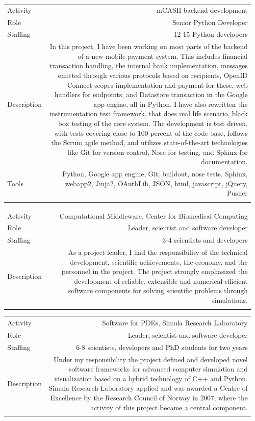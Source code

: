 \documentclass[english,a4paper,11pt]{article}
\begin{document}
\begin{tabular}{@{}LR}
Activity & mCASH backend development\\
Role & Senior Python Developer\\
Staffing & 12-15 Python developers\\
Description & In this project, I have been working on most parts of the backend of a new mobile payment system. This includes financial transaction handling, the internal bank implementation, messages emitted through various protocols based on recipients, OpenID Connect scopes implementation and payment for these, web handlers for endpoints, and Datastore transaction in the Google app engine, all in Python. I have also rewritten the instrumentation test framework, that does real life scenario, black box testing of the core system. The development is test driven, with tests covering close to 100 percent of the code base, follows the Scrum agile method, and utilizes state-of-the-art technologies like Git for version control, Nose for testing, and Sphinx for documentation. \\
Tools & Python, Google app engine, Git, buildout, nose tests, Sphinx, webapp2, Jinja2, OAuthLib, JSON, html, javascript, jQuery, Pusher\\ 
\addlinespace \bottomrule[.1pt] \addlinespace
   \end{tabular}

\begin{tabular}{@{}LR}
Activity & Computational Middleware, Center for Biomedical Computing\\
Role & Leader, scientist and software developer\\
Staffing & 3-4 scientists and developers\\
Description & As a project leader, I had the responsibility of the technical development, scientific achievements, the economy, and the personnel in the project. The project strongly emphasized the development of reliable, extensible and numerical efficient software components for solving scientific problems through simulations.\\ 
\addlinespace \bottomrule[.1pt] \addlinespace
   \end{tabular}

\begin{tabular}{@{}LR}
Activity & Software for PDEs, Simula Research Laboratory\\
Role & Leader, scientist and software developer\\
Staffing & 6-8 scientists, developers and PhD students for two years\\
Description & Under my responsibility the project defined and developed novel software frameworks for advanced computer simulation and visualization based on a hybrid technology of C++ and Python. Simula Research Laboratory applied and was awarded a Centre of Excellence by the Research Council of Norway in 2007, where the activity of this project became a central component.\\ 
\addlinespace \bottomrule[.1pt] \addlinespace
   \end{tabular}
\end{document}
